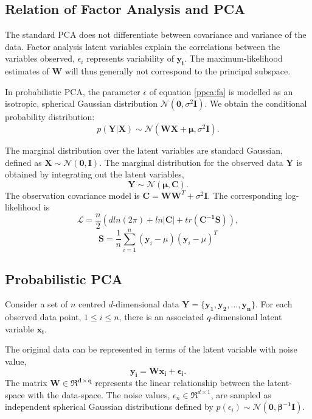 \documentclass[ %
                    author={Dillon Keith Diep [INCOMPLETE DRAFT, NOT FOR SUBMISSION]},
                supervisor={Dr. Carl Henrik Ek},
                    degree={MEng},
                     title={ART-CG:},
                  subtitle={Assisted Real-Time Content Generation of 3D Hair Geometry},
                      type={Research},
                      year={2014} ]{dissertation}
\begin{document}
\subsection{Relation of Factor Analysis and PCA}
The standard PCA does not differentiate between covariance and variance of the data. Factor analysis latent variables explain the correlations between the variables observed, $\epsilon_i$ represents variability of $\mathbf{y_i}$. The maximum-likelihood estimates of $\mathbf{W}$ will thus generally not correspond to the principal subspace.

In probabilistic PCA, the parameter $\epsilon$ of equation \ref{ppca:fa} is modelled as an isotropic, spherical Gaussian distribution $\mathcal{N}(\mathbf{0},\sigma^2\mathbf{I})$. We obtain the conditional probability distribution:
\begin{equation} \label{ppca:conditional}
	p(\mathbf{Y|X})\sim\mathcal{N}(\mathbf{WX+\mu},\sigma^2\mathbf{I}). 
\end{equation}

The marginal distribution over the latent variables are standard Gaussian, defined as $\mathbf{X\sim\mathcal{N}(0,I)}$. The marginal distribution for the observed data $\mathbf{Y}$ is obtained by integrating out the latent variables,
$$\mathbf{Y}\sim\mathcal{N}\mathbf{(\mu,C)}.$$
The observation covariance model is $\mathbf{C=WW}^T+\sigma^2\mathbf{I}$. The corresponding log-likelihood is
\begin{equation} \label{ppca:loglikelihood}
	\mathcal{L}=\frac{n}{2}(d ln(2\pi)+ln|\mathbf{C}|+tr(\mathbf{C^{-1}S})),
\end{equation}
$$\mathbf{S}=\frac{1}{n}\sum^n_{i=1}(\mathbf{y}_i-\mu)(\mathbf{y}_i-\mu)^T$$

\subsection{Probabilistic PCA}
Consider a set of $n$ centred $d$-dimensional data $\mathbf{Y=\{y_1,y_2,...,y_n\}}$.
For each observed data point, $1 \leq i \leq n $, there is an associated $q$-dimensional latent variable $\mathbf{x_i}$.

The original data can be represented in terms of the latent variable with noise value,
$$\mathbf{y_i=Wx_i+\epsilon_i}.$$
The matrix $\mathbf{W \in \Re^{d \times q}}$ represents the linear relationship between the latent-space with the  data-space. The noise values, $\epsilon_n \in \Re^{d \times 1}$, are sampled as independent spherical Gaussian distributions defined by $p(\epsilon_i)\sim\mathcal{N}(\mathbf{0, \beta^{-1}I})$.
\end{document}
